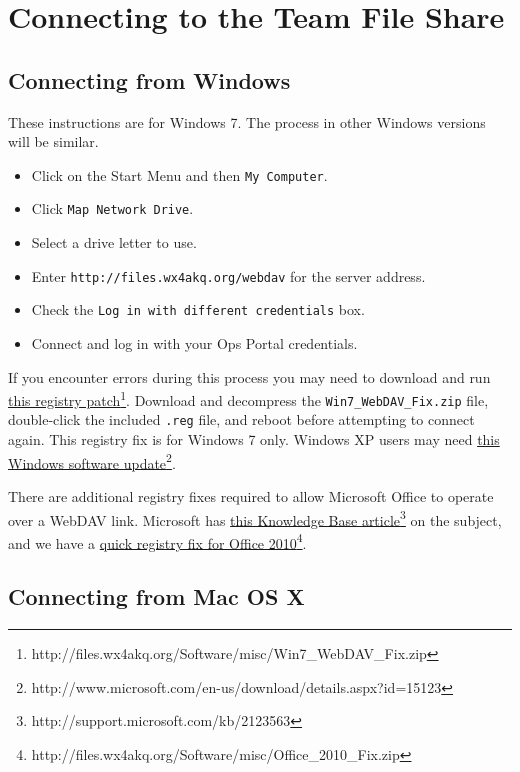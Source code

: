 \documentclass[pdflatex,letterpaper,twoside,12pt]{book}
\begin{document}
\section{Connecting to the Team File Share}

\subsection{Connecting from Windows}

These instructions are for Windows 7. The process in other Windows versions will be similar.

\begin{itemize}
\item Click on the Start Menu and then \texttt{My Computer}.
\item Click \texttt{Map Network Drive}.
\item Select a drive letter to use.
\item Enter \texttt{http://files.wx4akq.org/webdav} for the server address.
\item Check the \texttt{Log in with different credentials} box.
\item Connect and log in with your Ops Portal credentials.
\end{itemize}

If you encounter errors during this process you may need to download and run \href{http://files.wx4akq.org/Software/misc/Win7\_WebDAV\_Fix.zip}{this registry patch}\footnote{http://files.wx4akq.org/Software/misc/Win7\_WebDAV\_Fix.zip}. Download and decompress the \texttt{Win7\_WebDAV\_Fix.zip} file, double-click the included \texttt{.reg} file, and reboot before attempting to connect again. This registry fix is for Windows 7 only. Windows XP users may need \href{http://www.microsoft.com/en-us/download/details.aspx?id=15123}{this Windows software update}\footnote{http://www.microsoft.com/en-us/download/details.aspx?id=15123}.

There are additional registry fixes required to allow Microsoft Office to operate over a WebDAV link. Microsoft has \href{http://support.microsoft.com/kb/2123563}{this Knowledge Base article}\footnote{http://support.microsoft.com/kb/2123563} on the subject, and we have a \href{http://files.wx4akq.org/Software/misc/Office\_2010\_Fix.zip}{quick registry fix for Office 2010}\footnote{http://files.wx4akq.org/Software/misc/Office\_2010\_Fix.zip}.

\subsection{Connecting from Mac OS X}
\end{document}
